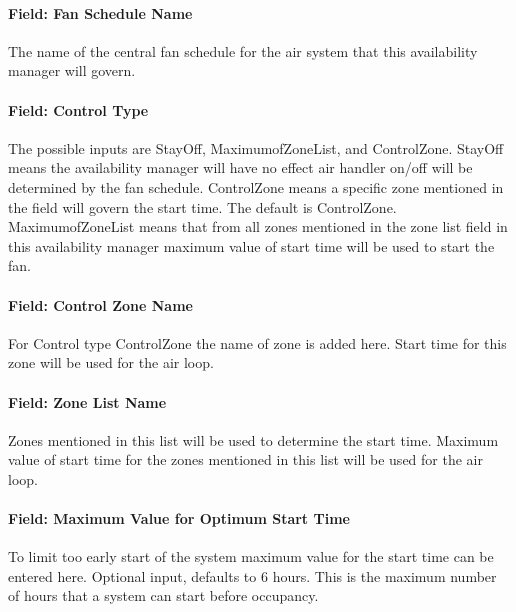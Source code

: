 \paragraph{Field: Fan Schedule Name}\label{field-fan-schedule-name-1}

The name of the central fan schedule for the air system that this availability manager will govern.

\paragraph{Field: Control Type}\label{field-control-type-003}

The possible inputs are StayOff, MaximumofZoneList, and ControlZone. StayOff means the availability manager will have no effect air handler on/off will be determined by the fan schedule. ControlZone means a specific zone mentioned in the field will govern the start time. The default is ControlZone. MaximumofZoneList means that from all zones mentioned in the zone list field in this availability manager maximum value of start time will be used to start the fan.

\paragraph{Field: Control Zone Name}\label{field-control-zone-name-1-000}

For Control type ControlZone the name of zone is added here. Start time for this zone will be used for the air loop.

\paragraph{Field: Zone List Name}\label{field-zone-list-name}

Zones mentioned in this list will be used to determine the start time. Maximum value of start time for the zones mentioned in this list will be used for the air loop.

\paragraph{Field: Maximum Value for Optimum Start Time}\label{field-maximum-value-for-optimum-start-time}

To limit too early start of the system maximum value for the start time can be entered here. Optional input, defaults to 6 hours. This is the maximum number of hours that a system can start before occupancy.

